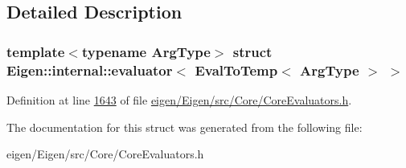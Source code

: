 \subsection{Detailed Description}
\subsubsection*{template$<$typename Arg\+Type$>$\newline
struct Eigen\+::internal\+::evaluator$<$ Eval\+To\+Temp$<$ Arg\+Type $>$ $>$}



Definition at line \hyperlink{eigen_2_eigen_2src_2_core_2_core_evaluators_8h_source_l01643}{1643} of file \hyperlink{eigen_2_eigen_2src_2_core_2_core_evaluators_8h_source}{eigen/\+Eigen/src/\+Core/\+Core\+Evaluators.\+h}.



The documentation for this struct was generated from the following file\+:\begin{DoxyCompactItemize}
\item 
eigen/\+Eigen/src/\+Core/\+Core\+Evaluators.\+h\end{DoxyCompactItemize}
